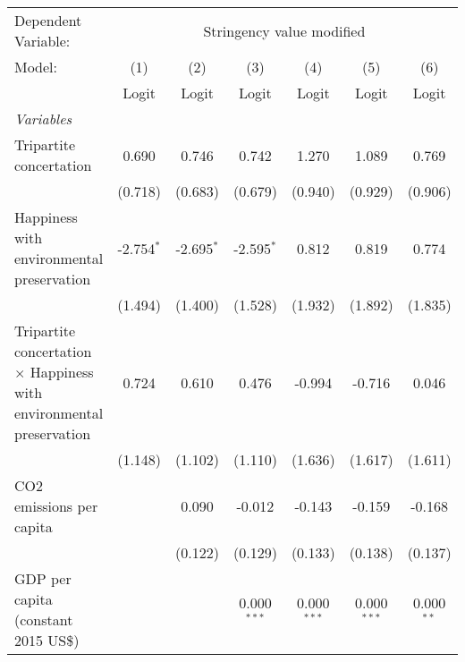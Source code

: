
\begingroup
\centering
\begin{tabular}{lcccccc}
   \toprule
   Dependent Variable: & \multicolumn{6}{c}{Stringency value modified}\\
   Model:                                                                      & (1)          & (2)          & (3)           & (4)           & (5)           & (6)\\  
                                                                               &  Logit       & Logit        & Logit         & Logit         & Logit         & Logit\\  
   \midrule
   \emph{Variables}\\
   Tripartite concertation                                                     & 0.690        & 0.746        & 0.742         & 1.270         & 1.089         & 0.769\\   
                                                                               & (0.718)      & (0.683)      & (0.679)       & (0.940)       & (0.929)       & (0.906)\\   
   Happiness with environmental preservation                                   & -2.754$^{*}$ & -2.695$^{*}$ & -2.595$^{*}$  & 0.812         & 0.819         & 0.774\\   
                                                                               & (1.494)      & (1.400)      & (1.528)       & (1.932)       & (1.892)       & (1.835)\\   
   Tripartite concertation $\times$ Happiness with environmental preservation  & 0.724        & 0.610        & 0.476         & -0.994        & -0.716        & 0.046\\   
                                                                               & (1.148)      & (1.102)      & (1.110)       & (1.636)       & (1.617)       & (1.611)\\   
   CO2 emissions per capita                                                    &              & 0.090        & -0.012        & -0.143        & -0.159        & -0.168\\   
                                                                               &              & (0.122)      & (0.129)       & (0.133)       & (0.138)       & (0.137)\\   
   GDP per capita (constant 2015 US\$)                                         &              &              & 0.000$^{***}$ & 0.000$^{***}$ & 0.000$^{***}$ & 0.000$^{**}$\\   

\end{tabular}
